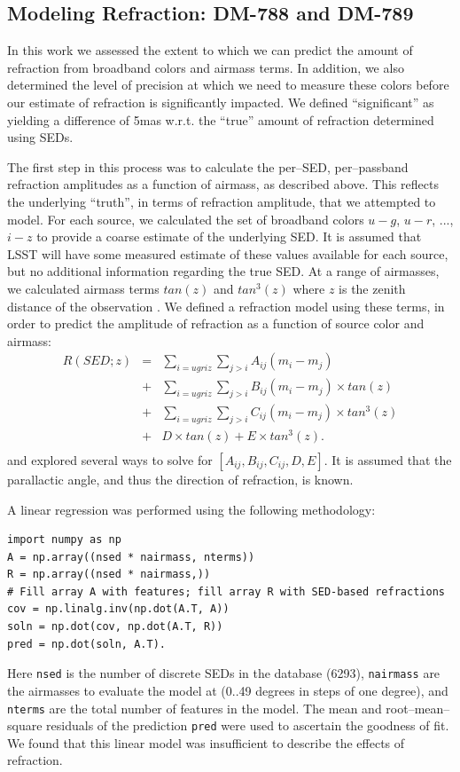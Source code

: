 \documentclass[DM,toc]{lsstdoc}
\begin{document}
\subsection{Modeling Refraction: DM-788 and DM-789}

In this work we assessed the extent to which we can predict the amount
of refraction from broadband colors and airmass terms.  In addition,
we also determined the level of precision at which we need to measure
these colors before our estimate of refraction is significantly
impacted.  We defined ``significant'' as yielding a difference of 5mas
w.r.t. the ``true'' amount of refraction determined using SEDs.

The first step in this process was to calculate the per--SED,
per--passband refraction amplitudes as a function of airmass, as
described above.  This reflects the underlying ``truth'', in terms of
refraction amplitude, that we attempted to model.  For each source, we
calculated the set of broadband colors $u-g$, $u-r$, ..., $i-z$ to
provide a coarse estimate of the underlying SED.  It is assumed that
LSST will have some measured estimate of these values available for
each source, but no additional information regarding the true SED.  At
a range of airmasses, we calculated airmass terms $tan(z)$ and
$tan^3(z)$ where $z$ is the zenith distance of the observation
\citep[e.g.][]{1996PASP..108.1051S}.  We defined a refraction model
using these terms, in order to predict the amplitude of refraction as
a function of source color and airmass:
\begin{eqnarray}
  R(SED;z) & = & \sum_{i=\textit{ugriz}}\sum_{j>i} A_{ij} (m_i - m_j)        \\ \nonumber
  & + & \sum_{i=\textit{ugriz}}\sum_{j>i} B_{ij} (m_i - m_j) \times tan(z)   \\ \nonumber
  & + & \sum_{i=\textit{ugriz}}\sum_{j>i} C_{ij} (m_i - m_j) \times tan^3(z) \\ \nonumber
  & + & D \times tan(z) + E \times tan^3(z).                              \\ \nonumber
\end{eqnarray}
and explored several ways to solve for $[A_{ij},B_{ij},C_{ij},D,E]$.
It is assumed that the parallactic angle, and thus the direction of
refraction, is known.

A linear regression was performed using the following methodology:
\begin{Verbatim}[frame=single]
import numpy as np
A = np.array((nsed * nairmass, nterms))
R = np.array((nsed * nairmass,))
# Fill array A with features; fill array R with SED-based refractions
cov = np.linalg.inv(np.dot(A.T, A))
soln = np.dot(cov, np.dot(A.T, R))
pred = np.dot(soln, A.T).
\end{Verbatim}
Here \texttt{nsed} is the number of discrete SEDs in the database (6293),
\texttt{nairmass} are the airmasses to evaluate the model at (0..49
degrees in steps of one degree), and \texttt{nterms} are the total number
of features in the model.  The mean and root--mean--square residuals
of the prediction \texttt{pred} were used to ascertain the goodness of
fit.  We found that this linear model was insufficient to describe the
effects of refraction.
\end{document}
